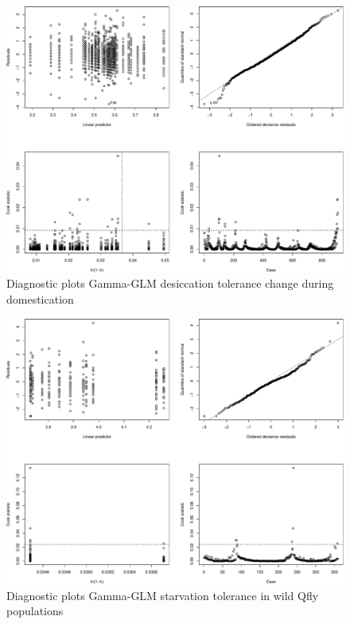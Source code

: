 \documentclass[]{article}
\begin{document}
\begin{figure}

{\centering \includegraphics{Supplementary_files/figure-latex/Diagnostic plots desiccation change during domestication-1} 

}

\caption{Diagnostic plots Gamma-GLM desiccation tolerance change during domestication}\label{fig:Diagnostic plots desiccation change during domestication}
\end{figure}

\begin{figure}

{\centering \includegraphics{Supplementary_files/figure-latex/Diagnostic plots starvation wild populations-1} 

}

\caption{Diagnostic plots Gamma-GLM starvation tolerance in wild Qfly populations}\label{fig:Diagnostic plots starvation wild populations}
\end{figure}
\end{document}
